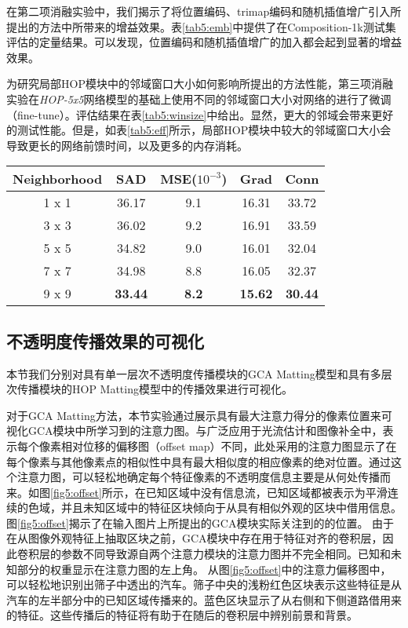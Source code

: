 在第二项消融实验中，我们揭示了将位置编码、trimap编码和随机插值增广引入所提出的方法中所带来的增益效果。表\ref{tab5:emb}中提供了在Composition-1k测试集\cite{xu2017deep}评估的定量结果。可以发现，位置编码和随机插值增广的加入都会起到显著的增益效果。

为研究局部HOP模块中的邻域窗口大小如何影响所提出的方法性能，第三项消融实验在\textit{HOP-5x5}网络模型的基础上使用不同的邻域窗口大小对网络的进行了微调（fine-tune）。评估结果在表\ref{tab5:winsize}中给出。显然，更大的邻域会带来更好的测试性能。但是，如表\ref{tab5:eff}所示，局部HOP模块中较大的邻域窗口大小会导致更长的网络前馈时间，以及更多的内存消耗。
\begin{table}[t]	
	\setlength{\tabcolsep}{8pt}
	\centering
	\small
	\begin{tabular}{c|cccc}  
		\toprule
		Neighborhood & SAD & MSE($10^{-3}$)& Grad & Conn\\%
		\midrule
		1 x 1 & 36.17& 9.1& 16.31& 33.72 \\  %
		3 x 3 & 36.02& 9.2 & 16.91& 33.59 \\  %
		5 x 5& 34.82& 9.0 & 16.01& 32.04  \\  %
		7 x 7 &34.98&8.8&16.05 & 32.37 \\  %
		9 x 9 &\textbf{33.44}&\textbf{8.2}& \textbf{15.62}&\textbf{30.44}  \\  %
		\bottomrule
	\end{tabular}
	\label{tab:winsize}
\end{table}

\subsection{不透明度传播效果的可视化}
本节我们分别对具有单一层次不透明度传播模块的GCA Matting模型和具有多层次传播模块的HOP Matting模型中的传播效果进行可视化。

对于GCA Matting方法，本节实验通过展示具有最大注意力得分的像素位置来可视化GCA模块中所学习到的注意力图。与广泛应用于光流估计\cite{FlowNet,LiteFlowNet,PWC-Net}和图像补全\cite{yu2018generative}中，表示每个像素相对位移的偏移图（offset map）不同，此处采用的注意力图显示了在每个像素与其他像素点的相似性中具有最大相似度的相应像素的绝对位置。通过这个注意力图，可以轻松地确定每个特征像素的不透明度信息主要是从何处传播而来。如图\ref{fig5:offset}所示，在已知区域中没有信息流，已知区域都被表示为平滑连续的色域，并且未知区域中的特征区块倾向于从具有相似外观的区块中借用信息。
图\ref{fig5:offset}揭示了在输入图片上所提出的GCA模块实际关注到的的位置。
由于在从图像外观特征上抽取区块之前，GCA模块中存在用于特征对齐的卷积层，因此卷积层的参数不同导致源自两个注意力模块的注意力图并不完全相同。已知和未知部分的权重显示在注意力图的左上角。
从图\ref{fig5:offset}中的注意力偏移图中，可以轻松地识别出筛子中透出的汽车。筛子中央的浅粉红色区块表示这些特征是从汽车的左半部分中的已知区域传播来的。蓝色区块显示了从右侧和下侧道路借用来的特征。这些传播后的特征将有助于在随后的卷积层中辨别前景和背景。

